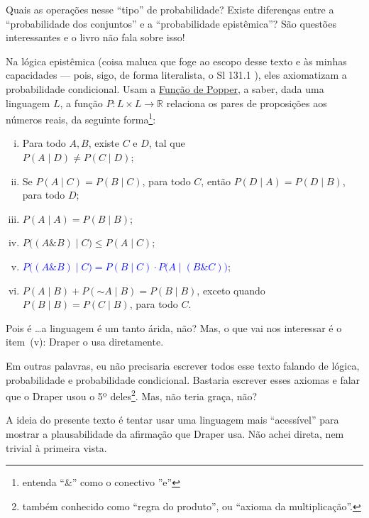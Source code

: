 \documentclass[12pt]{article}
\theoremstyle{definition}
\newcommand{\N}{\ensuremath{\sim\!}}
\begin{document}
		Quais as operações nesse ``tipo'' de probabilidade?
		Existe diferenças entre a ``probabilidade dos conjuntos'' e a ``probabilidade
		epistêmica''?
		São questões interessantes e o livro não fala sobre isso!
		
		Na lógica epistêmica (coisa maluca que foge ao escopo desse texto e às minhas
		capacidades --- pois, sigo, de forma literalista, o Sl 131.1 ), eles 
		axiomatizam	a probabilidade condicional.
		Usam a \href{https://plato.stanford.edu/entries/reasoning-defeasible/suppl4.html#:~:text=A\%20Popper\%20function\%20is\%20a,D\%20\%E2\%88\%A3\%20E\%20\%5D\%20\%E2\%89\%A0\%201\%20.}{Função de Popper},
		a saber, dada uma linguagem $L$, a função 
		$ P \colon L \times L \to \mathbb{R} $ relaciona os pares de proposições aos 
		números reais, da seguinte forma\footnote{entenda ``\&'' como o conectivo ''e''}:
			
		\begin{enumerate}[(i)]
			\item Para todo $A, B$, existe $C$ e $D$, tal que\\ $P(A\mid D) \neq P(C\mid D)$;
			\item Se $P(A\mid C)=P(B\mid C)$, para todo $C$, então 
			 $P(D\mid A)=P(D\mid B)$, para todo $D$;
			\item $P(A\mid A) = P(B\mid B)$;
			\item $P\big((A \& B)\mid C\big) \leq P(A\mid C)$;
			\item \textcolor{blue}{$P\big((A \& B) \mid C\big) = P(B\mid C)\cdot P\big(A\mid (B \& C)\big)$};
			\item $P(A\mid B) + P(\N A\mid B) = P(B\mid B)$, exceto quando 
			 $P(B\mid B) = P(C\mid B)$, para todo $C$.
		\end{enumerate}
		
		Pois é \ldots a linguagem é um tanto árida, não?
		Mas, o que vai nos interessar é o item~(v):	Draper o usa diretamente.
		
		Em outras palavras, eu não precisaria escrever todos esse texto falando de 
		lógica, probabilidade e probabilidade condicional.
		Bastaria escrever esses axiomas e falar que o Draper usou o 5º deles\footnote{
		também conhecido como ``regra do produto'', ou ``axioma da multiplicação''.}.
		Mas, não teria graça, não?
		
		A ideia do presente texto é tentar usar uma linguagem mais ``acessível'' para
		mostrar	a plausabilidade da afirmação que Draper usa.
		Não achei direta, nem trivial à primeira vista.
		
\end{document}
